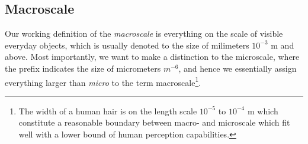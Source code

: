 
















\subsection{Macroscale}

Our working definition of the \textit{macroscale} is everything on the scale of visible everyday objects, which is usually denoted to the size of milimeters $10^{-3}$ m and above. Most importantly, we want to make a distinction to the microscale, where the prefix indicates the size of micrometers $m^{-6}$, and hence we essentially assign everything larger than \textit{micro} to the term macroscale\footnote{The width of a human hair is on the length scale $10^{-5}$ to $10^{-4}$ m which constitute a reasonable boundary between macro- and microscale which fit well with a lower bound of human perception capabilities.}.

